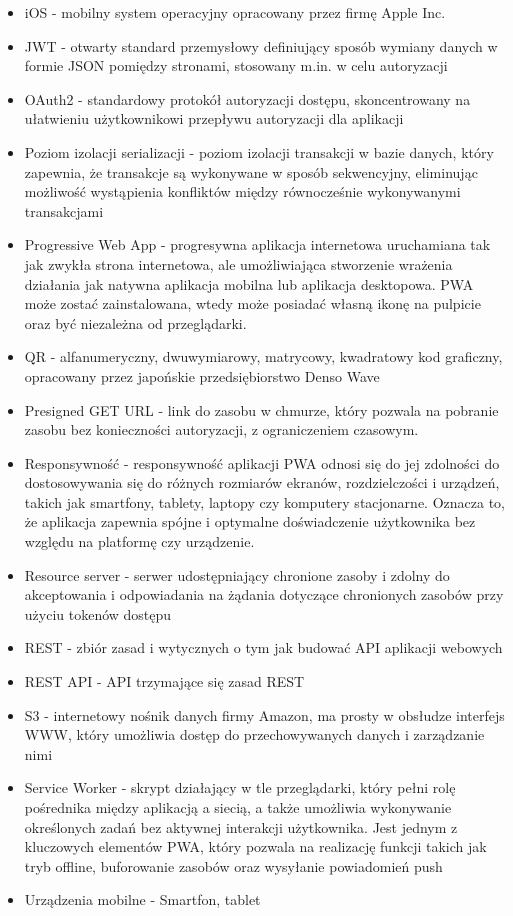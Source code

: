 \documentclass[../main.tex]{subfiles}
\begin{document}
\begin{itemize}
        \item iOS - mobilny system operacyjny opracowany przez firmę Apple Inc.
        \item JWT - otwarty standard przemysłowy definiujący sposób wymiany danych w formie JSON pomiędzy stronami, stosowany m.in. w celu autoryzacji
        \item OAuth2 - standardowy protokół autoryzacji dostępu, skoncentrowany na ułatwieniu użytkownikowi przepływu autoryzacji dla aplikacji
        \item Poziom izolacji serializacji - poziom izolacji transakcji w bazie danych, który zapewnia, że transakcje są wykonywane w sposób sekwencyjny, eliminując możliwość wystąpienia konfliktów między równocześnie wykonywanymi transakcjami
        \item Progressive Web App - progresywna aplikacja internetowa uruchamiana tak jak zwykła strona internetowa, ale umożliwiająca stworzenie wrażenia działania jak natywna aplikacja mobilna lub aplikacja desktopowa. PWA może zostać zainstalowana, wtedy może posiadać własną ikonę na pulpicie oraz być niezależna od przeglądarki.
        \item QR - alfanumeryczny, dwuwymiarowy, matrycowy, kwadratowy kod graficzny, opracowany przez japońskie przedsiębiorstwo Denso Wave
        \item Presigned GET URL - link do zasobu w chmurze, który pozwala na pobranie zasobu bez konieczności autoryzacji, z ograniczeniem czasowym.
        \item Responsywność - responsywność aplikacji PWA odnosi się do jej zdolności do dostosowywania się do różnych rozmiarów ekranów, rozdzielczości i urządzeń, takich jak smartfony, tablety, laptopy czy komputery stacjonarne. Oznacza to, że aplikacja zapewnia spójne i optymalne doświadczenie użytkownika bez względu na platformę czy urządzenie.
        \item Resource server - serwer udostępniający chronione zasoby i zdolny do akceptowania i odpowiadania na żądania dotyczące chronionych zasobów przy użyciu tokenów dostępu
        \item REST - zbiór zasad i wytycznych o tym jak budować API aplikacji webowych
        \item REST API - API trzymające się zasad REST
        \item S3 -  internetowy nośnik danych firmy Amazon, ma prosty w obsłudze interfejs WWW, który umożliwia dostęp do przechowywanych danych i zarządzanie nimi
        \item Service Worker - skrypt działający w tle przeglądarki, który pełni rolę pośrednika między aplikacją a siecią, a także umożliwia wykonywanie określonych zadań bez aktywnej interakcji użytkownika. Jest jednym z kluczowych elementów PWA, który pozwala na realizację funkcji takich jak tryb offline, buforowanie zasobów oraz wysyłanie powiadomień push
        \item Urządzenia mobilne - Smartfon, tablet
    \end{itemize}
\end{document}
